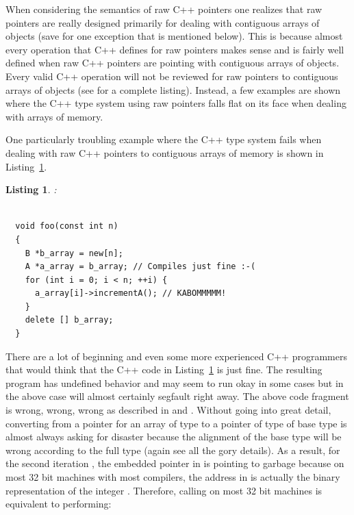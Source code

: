 \documentclass[pdf,ps2pdf,11pt]{SANDreport}
\newtheorem{listing}{Listing}
\begin{document}
When considering the semantics of raw C++ pointers one realizes that
raw pointers are really designed primarily for dealing with contiguous
arrays of objects (save for one exception that is mentioned below).
This is because almost every operation that C++ defines for raw
pointers makes sense and is fairly well defined when raw C++ pointers
are pointing with contiguous arrays of objects.  Every valid C++
operation will not be reviewed for raw pointers to contiguous arrays
of objects (see {}\cite{stroustrup97} for a complete listing).
Instead, a few examples are shown where the C++ type system using raw
pointers falls flat on its face when dealing with arrays of memory.

One particularly troubling example where the C++ type system fails
when dealing with raw C++ pointers to contiguous arrays of memory is
shown in Listing~\ref{listing:BadArrayPointerConversion}.

\begin{listing}:\\
\label{listing:BadArrayPointerConversion}
{\small\begin{verbatim}

  void foo(const int n)
  {
    B *b_array = new[n];
    A *a_array = b_array; // Compiles just fine :-(
    for (int i = 0; i < n; ++i) {
      a_array[i]->incrementA(); // KABOMMMMM!
    }
    delete [] b_array;
  }

\end{verbatim}}
\end{listing}

There are a lot of beginning and even some more experienced C++
programmers that would think that the C++ code in
Listing~\ref{listing:BadArrayPointerConversion} is just fine.  The
resulting program has undefined behavior and may seem to run okay in
some cases but in the above case will almost certainly segfault right
away.  The above code fragment is wrong, wrong, wrong as described in
{}\cite[Gotcha 33]{C++Gotchas03} and {}\cite[Item
100]{C++CodingStandards05}.  Without going into great detail,
converting from a pointer for an array of type {} to a pointer
of type of base type {} is almost always asking for disaster
because the alignment of the base type {} will be wrong
according to the full type {} (again see {}\cite[Gotcha
33]{C++Gotchas03} all the gory details).  As a result, for the second
iteration {}, the embedded pointer in
{} is pointing to garbage because on most
32 bit machines with most compilers, the address in
{} is actually the binary representation
of the integer {}.  Therefore, calling
{} on most 32 bit machines is
equivalent to performing:
\end{document}
